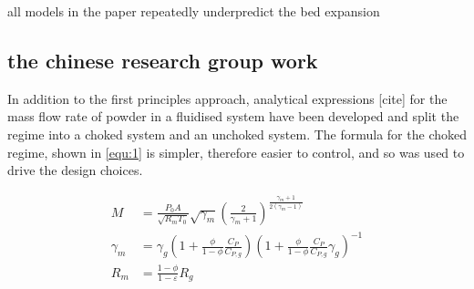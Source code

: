 all models in the paper repeatedly underpredict the bed expansion
\subsection{the chinese research group work}

In addition to the first principles approach, analytical expressions [cite] for the mass flow rate of powder in a fluidised system have been developed and split the regime into a choked system and an unchoked system. The formula for the choked regime, shown in \autoref{equ:1} is simpler, therefore easier to control, and so was used to drive the design choices.

\begin{align}
    M &= \frac{P_0 A}{\sqrt{R_m T_0}} \sqrt{\gamma_m} {\left( \frac{2}{\gamma_m + 1} \right)}^{\frac{\gamma_m + 1}{2(\gamma_m - 1)}} \\[10pt]
    \gamma_m &= \gamma_g \left( 1 + \frac{\phi}{1 - \phi} \frac{C_P}{C_{P,g}} \right) {\left( 1 + \frac{\phi}{1 - \phi} \frac{C_P}{C_{P,g}} \gamma_g \right)}^{-1} \\[10pt]
    R_m &= \frac{1 - \phi}{1 - \varepsilon} R_g
\end{align}\label{equ:1}
    